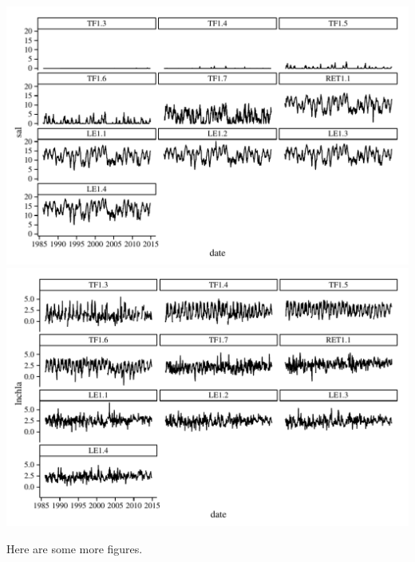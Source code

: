 \documentclass[letterpaper,12pt]{article}\usepackage[]{graphicx}\usepackage[]{color}
\makeatletter
\def\maxwidth{ %
  \ifdim\Gin@nat@width>\linewidth
    \linewidth
  \else
    \Gin@nat@width
  \fi
}
\makeatother
\begin{document}
{\centering \includegraphics[width=\maxwidth]{figs/unnamed-chunk-41} 
\includegraphics[width=\maxwidth]{figs/unnamed-chunk-42} 

}




Here are some more figures.
\end{document}
